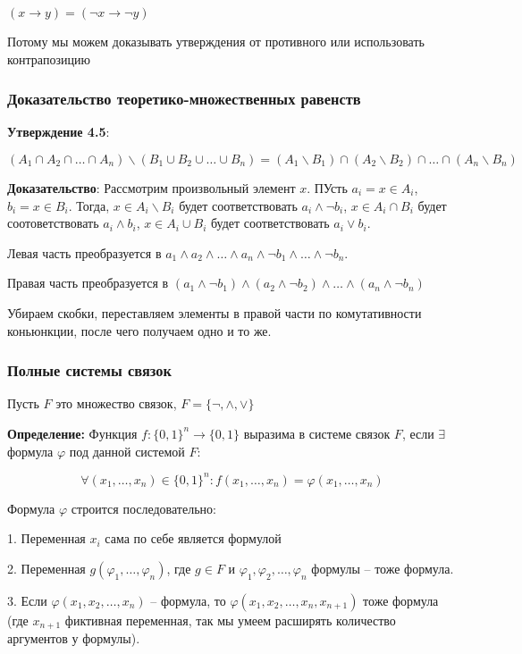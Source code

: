 \documentclass[openany]{article}
\begin{document}
   $(x \rightarrow y) = (\neg x \rightarrow \neg y)$

   Потому мы можем доказывать утверждения от противного или использовать контрапозицию

   \subsubsection{Доказательство теоретико-множественных равенств}

   \textbf{Утверждение 4.5}: 

   $$(A_1 \cap A_2 \cap \ldots \cap A_n) \backslash (B_1 \cup B_2 \cup \ldots \cup B_n) = (A_1 \backslash B_1) \cap (A_2 \backslash B_2) \cap \ldots \cap (A_n \backslash B_n)$$

   \textbf{Доказательство}: Рассмотрим произвольный элемент $x$. ПУсть $a_i = x \in A_i$, $b_i = x \in B_i$. Тогда, $x \in A_i \backslash B_i$ будет соответствовать $a_i \wedge \neg b_i$, $x \in A_i \cap B_i$ будет соотоветствовать $a_i \wedge b_i$, $x \in A_i \cup B_i$ будет соответствовать $a_i \vee b_i$.

   Левая часть преобразуется в $a_1 \wedge a_2 \wedge \ldots \wedge a_n \wedge \neg b_1 \wedge \ldots \wedge \neg b_n$.

   Правая часть преобразуется в $(a_1 \wedge \neg b_1) \wedge (a_2 \wedge \neg b_2) \wedge \ldots \wedge (a_n \wedge \neg b_n)$

   Убираем скобки, переставляем элементы в правой части по комутативности коньюнкции, после чего получаем одно и то же.

   \subsubsection{Полные системы связок}

   Пусть $F$ это множество связок, $F = \{\neg, \wedge, \vee\}$

   \textbf{Определение:} Функция $f: \{0, 1\}^n \rightarrow \{0, 1\}$ выразима в системе связок $F$, если $\exists$ формула $\varphi$ под данной системой $F$:

   $$\forall (x_1, \ldots, x_n) \in \{0, 1\}^n: f(x_1, \ldots, x_n) = \varphi(x_1, \ldots, x_n)$$

   Формула $\varphi$ строится последовательно:

   \hspace{0.5cm}\parbox{11cm}{
       1. Переменная $x_i$ сама по себе является формулой

       2. Переменная $g(\varphi_1, \ldots, \varphi_n)$, где $g \in F$ и $\varphi_1, \varphi_2, \ldots, \varphi_n$ формулы -- тоже формула.

       3. Если $\varphi(x_1, x_2, \ldots, x_n)$ -- формула, то $\varphi(x_1, x_2, \ldots, x_n, x_{n + 1})$ тоже формула (где $x_{n + 1}$ фиктивная переменная, так мы умеем расширять количество аргументов у формулы).
   }
\end{document}
